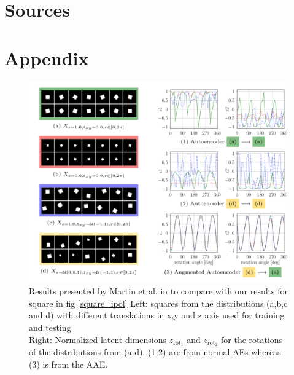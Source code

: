 \documentclass[10pt,a4paper]{article}
\newcommand{\rot}{\ensuremath{\text{rot}\xspace}}
\begin{document}
 
\newpage
\section{Sources}\label{Sources}
\printbibliography

\section{Appendix}
\begin{figure}
\center
\includegraphics[width = \linewidth]{MARTIN_Squares.png}
\caption{Results presented by Martin et al. in \cite{3D_Orientation_Learning} to compare with our results for square in fig \ref{square_ipol}
Left: squares from the distributions (a,b,c and d) with different translations in x,y and z axis used for training and testing\\
Right: Normalized latent dimensions $z_{\rot_1}$ and $z_{\rot_2}$ for the rotations of the distributions from (a-d). (1-2) are from normal AEs whereas (3) is from the AAE.}\label{SQUARE_Martin}
\end{figure}
\end{document}
